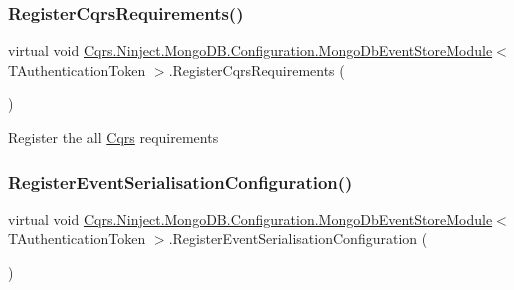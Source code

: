 \subsubsection{\texorpdfstring{Register\+Cqrs\+Requirements()}{RegisterCqrsRequirements()}}
{\footnotesize\ttfamily virtual void \hyperlink{classCqrs_1_1Ninject_1_1MongoDB_1_1Configuration_1_1MongoDbEventStoreModule}{Cqrs.\+Ninject.\+Mongo\+D\+B.\+Configuration.\+Mongo\+Db\+Event\+Store\+Module}$<$ T\+Authentication\+Token $>$.Register\+Cqrs\+Requirements (\begin{DoxyParamCaption}{ }\end{DoxyParamCaption})\hspace{0.3cm}{\ttfamily [virtual]}}



Register the all \hyperlink{namespaceCqrs}{Cqrs} requirements 

\mbox{\label{classCqrs_1_1Ninject_1_1MongoDB_1_1Configuration_1_1MongoDbEventStoreModule_a34736afbd831dd3cd1ec04708a5a519e_a34736afbd831dd3cd1ec04708a5a519e}} 
\subsubsection{\texorpdfstring{Register\+Event\+Serialisation\+Configuration()}{RegisterEventSerialisationConfiguration()}}
{\footnotesize\ttfamily virtual void \hyperlink{classCqrs_1_1Ninject_1_1MongoDB_1_1Configuration_1_1MongoDbEventStoreModule}{Cqrs.\+Ninject.\+Mongo\+D\+B.\+Configuration.\+Mongo\+Db\+Event\+Store\+Module}$<$ T\+Authentication\+Token $>$.Register\+Event\+Serialisation\+Configuration (\begin{DoxyParamCaption}{ }\end{DoxyParamCaption})\hspace{0.3cm}{\ttfamily [virtual]}}



